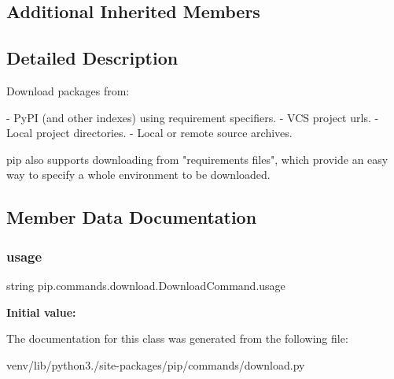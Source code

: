 \subsection*{Additional Inherited Members}


\subsection{Detailed Description}
\begin{DoxyVerb}Download packages from:

- PyPI (and other indexes) using requirement specifiers.
- VCS project urls.
- Local project directories.
- Local or remote source archives.

pip also supports downloading from "requirements files", which provide
an easy way to specify a whole environment to be downloaded.
\end{DoxyVerb}
 

\subsection{Member Data Documentation}
\mbox{\label{classpip_1_1commands_1_1download_1_1_download_command_a59f1d0905d9560a715a3e040f0c20e09}} 
\subsubsection{\texorpdfstring{usage}{usage}}
{\footnotesize\ttfamily string pip.\+commands.\+download.\+Download\+Command.\+usage\hspace{0.3cm}{\ttfamily [static]}}

{\bfseries Initial value\+:}
\begin{DoxyCode}
=  \textcolor{stringliteral}{"""}
\textcolor{stringliteral}{  %
\textcolor{stringliteral}{  %
\textcolor{stringliteral}{  %
\textcolor{stringliteral}{  %
\textcolor{stringliteral}{  %
\end{DoxyCode}


The documentation for this class was generated from the following file\+:\begin{DoxyCompactItemize}
\item 
venv/lib/python3./site-\/packages/pip/commands/download.\+py\end{DoxyCompactItemize}
